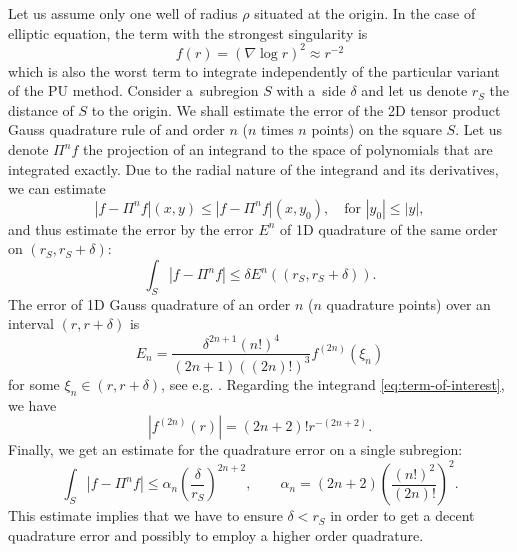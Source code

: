 \documentclass{elsarticle}
\def\vc#1{\mathbf{\boldsymbol{#1}}}     %
\def\abs#1{\left|#1\right|}
\def\d{\mathrm{d}}
\def\abs#1{| #1 |}
\newcommand{\noteJB}[1]{{\color{Blue} \textbf{JB: } \textit{#1}}}
\begin{document}
Let us assume only one well of radius $\rho$ situated at the origin. In the case of elliptic equation, the term with the strongest singularity is 
\begin{equation}
    \label{eq:term-of-interest}
    f(r)=(\nabla \log r )^2 \approx r^{-2}
\end{equation}
which is also the worst term to integrate independently of the particular variant of the PU method.
Consider a~subregion $S$ with a~side $\delta$ and 
let us denote $r_{S}$ the distance of $S$ to the origin.
We shall estimate the error of the 2D tensor product Gauss quadrature rule of and order $n$ ($n$ times $n$ points) on the square $S$. Let us denote 
$\Pi^n f$ the projection of an integrand to the space of polynomials that are integrated exactly. Due to the radial nature of the integrand and its derivatives,
we can estimate
\[
  \abs{f-\Pi^n f}(x,y) \le \abs{f-\Pi^n f}(x,y_0), \quad \text{for } \abs{y_0} \le \abs{y},
\]
and thus estimate the error by the error $E^n$ of 
 1D quadrature of the same order on $(r_{S}, r_{S}+\delta)$:
\[
  \int_S \abs{f-\Pi^n f} \le \delta E^n((r_{S}, r_{S}+\delta)).
\]
The error of 1D Gauss quadrature of an order $n$ ($n$ quadrature points) over an interval $(r,r+\delta)$ is 
\[
  E_n = \frac{\delta^{2n+1} (n!)^4}{(2n+1)((2n)!)^3} f^{(2n)}(\xi_n) 
\]
for some $\xi_n \in (r, r+\delta)$, see e.g. \cite{kahaner_numerical_1989}. 
Regarding the integrand \eqref{eq:term-of-interest}, we have 
\[
  \abs{f^{(2n)}(r)} = (2n+2)! r^{-(2n+2)}.
\]
Finally, we get an estimate for the quadrature error on a single subregion:
\[
    \int_S \abs{f-\Pi^n f} \le  \alpha_n \left( \frac{\delta}{r_{S}} \right)^{2n+2}, 
  \qquad \alpha_n = (2n+2)\left( \frac{(n!)^2}{(2n)!} \right)^2.
\]
This estimate implies that we have to ensure $\delta < r_S$ in order to get a decent quadrature error 
and possibly to employ a higher order quadrature. 


\end{document}
